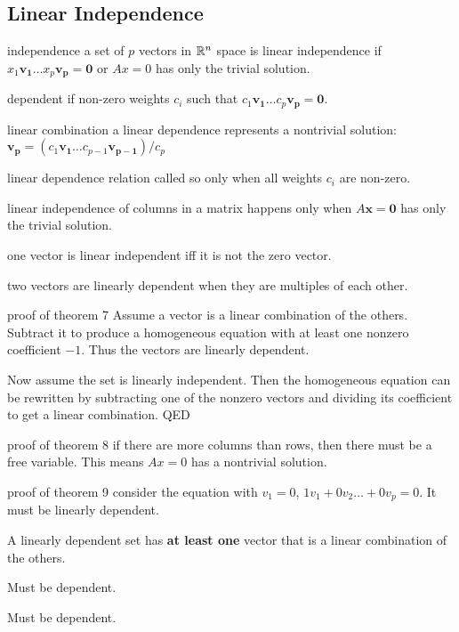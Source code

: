 \begin{card}
    \subsection{Linear Independence}

    \begin{compactdesc}
    \item[independence] a set of $p$ vectors in $\mathbb{R}^n$ space is linear
        independence if $x_1 \bm{v_1} \dots x_p \bm{v_p} = \bm{0}$ or $Ax = 0$
        has only the trivial solution.
    \item[dependent] if non-zero weights $c_i$ such that
        $c_1 \bm{v_1} \dots c_p \bm{v_p} = \bm{0}$.
    \item[linear combination] a linear dependence represents a nontrivial
        solution: $\bm{v_p} = (c_1 \bm{v_1} \dots c_{p-1} \bm{v_{p-1}}) / c_p$
    \item[linear dependence relation] called so only when all weights $c_i$
        are non-zero.
    \item[linear independence of columns] in a matrix happens only when
        $A\bm{x = 0}$ has only the trivial solution.
    \item[one vector] is linear independent iff it is not the zero vector.
    \item[two vectors] are linearly dependent when they are multiples of each
        other.
    \item[proof of theorem 7] Assume a vector is a linear combination of the
        others. Subtract it to produce a homogeneous equation with at least one
        nonzero coefficient $-1$. Thus the vectors are linearly dependent.

        Now assume the set is linearly independent. Then the homogeneous equation
        can be rewritten by subtracting one of the nonzero vectors and
        dividing its coefficient to get a linear combination. QED
    \item[proof of theorem 8] if there are more columns than rows, then there
        must be a free variable. This means $Ax = 0$ has a nontrivial solution.
    \item[proof of theorem 9] consider the equation with $v_1 = 0$,
        $1v_1 + 0v_2 \dots + 0v_p = 0$. It must be linearly dependent.
    \end{compactdesc}

    \begin{theorem}
        A linearly dependent set has \textbf{at least one} vector that is a
        linear combination of the others.
    \end{theorem}

    \begin{theorem}
        Must be dependent.
    \end{theorem}

    \begin{theorem}
        Must be dependent.
    \end{theorem}
\end{card}



